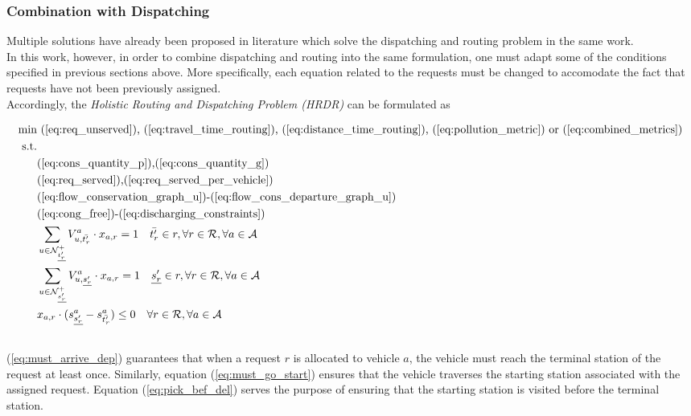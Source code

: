 \subsubsection*{Combination with Dispatching}
Multiple solutions have already been proposed in literature which solve the dispatching and routing problem in the same work. \\
In this work, however, in order to combine dispatching and routing into the same formulation, one must adapt some of the conditions specified in previous sections above. More specifically, each equation related to the requests must be changed to accomodate the fact that requests have not been previously assigned. \\
Accordingly, the \textit{Holistic Routing and Dispatching Problem (HRDR)} can be formulated as 

\begin{align}
	\text{min}&  \text{
		(\ref{eq:req_unserved}),
		(\ref{eq:travel_time_routing}), (\ref{eq:distance_time_routing}), (\ref{eq:pollution_metric}) or (\ref{eq:combined_metrics})
	}\nonumber\\
	\text{s.t.} &\nonumber\\
	&\text{(\ref{eq:cons_quantity_p}),(\ref{eq:cons_quantity_g})}\nonumber\\	
	&\text{(\ref{eq:req_served}),(\ref{eq:req_served_per_vehicle})}\nonumber\\	
	&\text{(\ref{eq:flow_conservation_graph_u})-(\ref{eq:flow_cons_departure_graph_u})}\nonumber\\
	&\text{(\ref{eq:cong_free})-(\ref{eq:discharging_constraints})}\nonumber\\
	&\sum_{u \in \mathcal{N}^+_{\underline{t'_r}} } V^a_{u, \bar{t'_r}} \cdot x_{a,r}= 1 \quad  \bar{t'_r} \in r, \forall r \in \mathcal{R}, \forall a \in \mathcal{A} \label{eq:must_arrive_dep}	\\
	&\sum_{u \in \mathcal{N}^+_{\underline{s'_r}} } V^a_{u, \underline{s'_r}} \cdot x_{a,r}= 1 \quad  \underline{s'_r} \in r, \forall r \in \mathcal{R}, \forall a \in \mathcal{A}\label{eq:must_go_start}\\
	&x_{a,r}\cdot(s_{\underline{s'_r}}^a - s_{\bar{t'_r}}^a) \leq 0 \quad \forall r \in \mathcal{R}, \forall a \in \mathcal{A}\label{eq:pick_bef_del}\\
	\nonumber
\end{align}
(\ref{eq:must_arrive_dep}) guarantees that when a request $r$ is allocated to vehicle $a$, the vehicle must reach the terminal station of the request at least once. Similarly, equation (\ref{eq:must_go_start}) ensures that the vehicle traverses the starting station associated with the assigned request. Equation (\ref{eq:pick_bef_del}) serves the purpose of ensuring that the starting station is visited before the terminal station.
